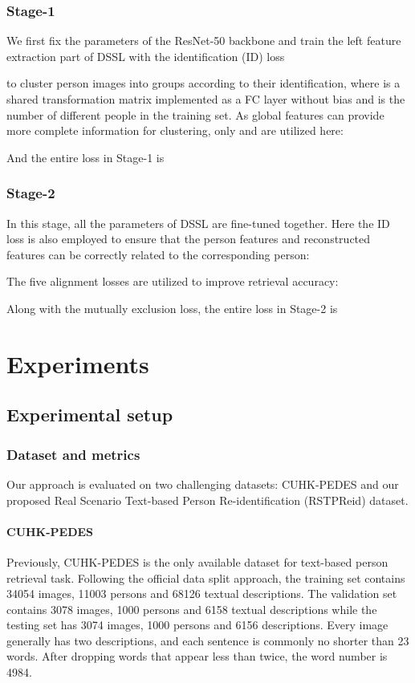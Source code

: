\documentclass[sigconf]{acmart}
\begin{document}
\subsubsection{Stage-1}
We first fix the parameters of the ResNet-50 backbone and train the left feature extraction part of DSSL with the identification (ID) loss 

to cluster person images into groups according to their identification, where  is a shared transformation matrix implemented as a FC layer without bias and  is the number of different people in the training set. As global features can provide more complete information for clustering, only  and  are utilized here: 

And the entire loss in Stage-1 is


\subsubsection{Stage-2}
In this stage, all the parameters of DSSL are fine-tuned together. Here the ID loss is also employed to ensure that the person features and reconstructed features can be correctly related to the corresponding person:

The five alignment losses are utilized to improve retrieval accuracy:

Along with the mutually exclusion loss, the entire loss in Stage-2 is


\section{Experiments}
\subsection{Experimental setup}
\subsubsection{Dataset and metrics}
Our approach is evaluated on two challenging datasets: CUHK-PEDES \cite{Shuang2017Person} and our proposed Real Scenario Text-based Person Re-identification (RSTPReid) dataset.

\paragraph{CUHK-PEDES} Previously, CUHK-PEDES \cite{Shuang2017Person} is the only available dataset for text-based person retrieval task. Following the official data split approach, the training set contains 34054 images, 11003 persons and 68126 textual descriptions. The validation set contains 3078 images, 1000 persons and 6158 textual descriptions while the testing set has 3074 images, 1000 persons and 6156 descriptions. Every image generally has two descriptions, and each sentence is commonly no shorter than 23 words. After dropping words that appear less than twice, the word number is 4984.
\end{document}
